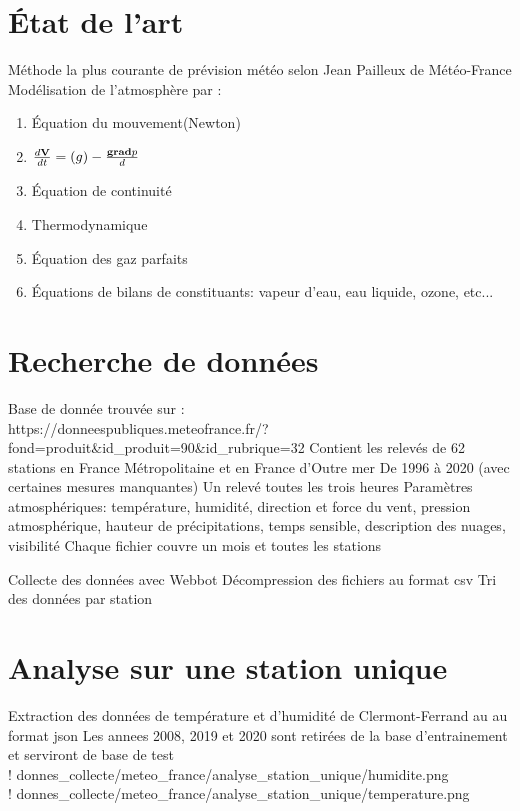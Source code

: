 \documentclass[11pt,a4paper]{article}
\begin{document}
{ 
\section{État de l'art}
Méthode la plus courante de prévision météo selon Jean Pailleux de Météo-France
Modélisation de l'atmosphère par :
\begin{enumerate}
\item Équation du mouvement(Newton)
\item $\frac{d\bold{V}}{dt} = \bold(g) - \frac{\bold{grad}p}{d} $
\item Équation de continuité
\item Thermodynamique
\item Équation des gaz parfaits
\item Équations de bilans de constituants: vapeur d’eau, eau liquide, ozone, etc...
\end{enumerate}

\section{Recherche de données}

Base de donnée trouvée sur  : \\
https://donneespubliques.meteofrance.fr/?fond=produit\&id\_produit=90\&id\_rubrique=32
Contient les relevés de 62 stations en France Métropolitaine et en France d’Outre mer
De 1996 à 2020  (avec certaines mesures manquantes)
Un relevé toutes les trois heures
Paramètres atmosphériques: température, humidité, direction et force du vent, pression atmosphérique, hauteur de précipitations, temps sensible, description des nuages, visibilité
Chaque fichier couvre un mois et toutes les stations

Collecte des données avec Webbot
Décompression des fichiers au format csv
Tri des données par station

\section{Analyse sur une station unique}

Extraction des données de température et d'humidité de Clermont-Ferrand au au format json
Les annees 2008, 2019 et 2020 sont retirées de la base d'entrainement et serviront de base de test\\
! donnes\_collecte/meteo\_france/analyse\_station\_unique/humidite.png\\
! donnes\_collecte/meteo\_france/analyse\_station\_unique/temperature.png\\

}
\end{document}
